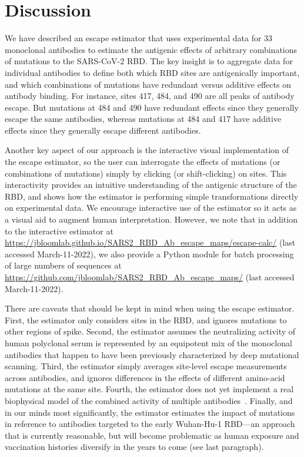 \documentclass[9pt,twocolumn,twoside]{gsajnl_modified}
\begin{document}
\section{Discussion}
We have described an escape estimator that uses experimental data for 33 monoclonal antibodies to estimate the antigenic effects of arbitrary combinations of mutations to the SARS-CoV-2 RBD.
The key insight is to aggregate data for individual antibodies to define both which RBD sites are antigenically important, and which combinations of mutations have redundant versus additive effects on antibody binding.
For instance, sites 417, 484, and 490 are all peaks of antibody escape.
But mutations at 484 and 490 have redundant effects since they generally escape the same antibodies, whereas mutations at 484 and 417 have additive effects since they generally escape different antibodies.

Another key aspect of our approach is the interactive visual implementation of the escape estimator, so the user can interrogate the effects of mutations (or combinations of mutations) simply by clicking (or shift-clicking) on sites.
This interactivity provides an intuitive understanding of the antigenic structure of the RBD, and shows how the estimator is performing simple transformations directly on experimental data.
We encourage interactive use of the estimator so it acts as a visual aid to augment human interpretation.
However, we note that in addition to the interactive estimator at \url{https://jbloomlab.github.io/SARS2_RBD_Ab_escape_maps/escape-calc/} (last accessed March-11-2022), we also provide a Python module for batch processing of large numbers of sequences at \url{https://github.com/jbloomlab/SARS2_RBD_Ab_escape_maps/} (last accessed March-11-2022).

There are caveats that should be kept in mind when using the escape estimator.
First, the estimator only considers sites in the RBD, and ignores mutations to other regions of spike.
Second, the estimator assumes the neutralizing activity of human polyclonal serum is represented by an equipotent mix of the monoclonal antibodies that happen to have been previously characterized by deep mutational scanning.
Third, the estimator simply averages site-level escape measurements across antibodies, and ignores differences in the effects of different amino-acid mutations at the same site.
Fourth, the estimator does not yet implement a real biophysical model of the combined activity of multiple antibodies~\citep{einav2020two}.
Finally, and in our minds most significantly, the estimator estimates the impact of mutations in reference to antibodies targeted to the early Wuhan-Hu-1 RBD---an approach that is currently reasonable, but will become problematic as human exposure and vaccination histories diversify in the years to come (see last paragraph).
\end{document}
